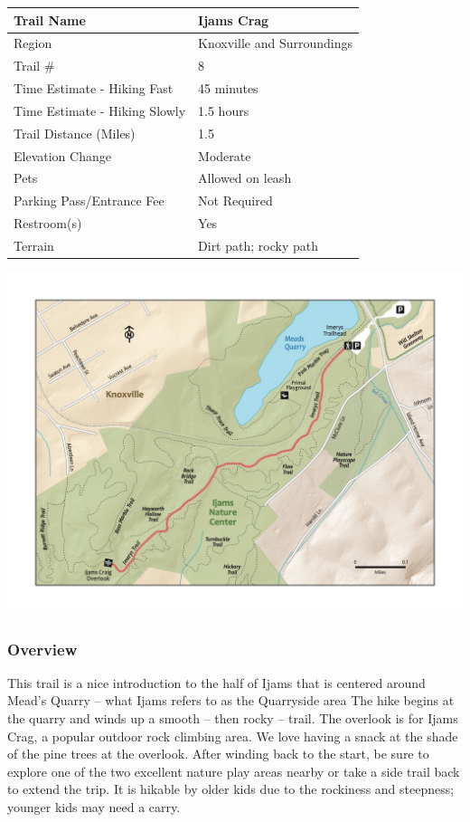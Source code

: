 \documentclass[
  letterpaper,
  DIV=11,
  numbers=noendperiod]{scrartcl}
\begin{document}
\begin{longtable}[]{@{}ll@{}}
\toprule\noalign{}
Trail Name & Ijams Crag \\
\midrule\noalign{}
\endhead
\bottomrule\noalign{}
\endlastfoot
Region & Knoxville and Surroundings \\
Trail \# & 8 \\
Time Estimate - Hiking Fast & 45 minutes \\
Time Estimate - Hiking Slowly & 1.5 hours \\
Trail Distance (Miles) & 1.5 \\
Elevation Change & Moderate \\
Pets & Allowed on leash \\
Parking Pass/Entrance Fee & Not Required \\
Restroom(s) & Yes \\
Terrain & Dirt path; rocky path \\
\end{longtable}

\includegraphics{maps/trail-08-map.jpeg}

\hypertarget{overview-7}{%
\subsubsection{Overview}\label{overview-7}}

This trail is a nice introduction to the half of Ijams that is centered
around Mead's Quarry -- what Ijams refers to as the Quarryside area The
hike begins at the quarry and winds up a smooth -- then rocky -- trail.
The overlook is for Ijams Crag, a popular outdoor rock climbing area. We
love having a snack at the shade of the pine trees at the overlook.
After winding back to the start, be sure to explore one of the two
excellent nature play areas nearby or take a side trail back to extend
the trip. It is hikable by older kids due to the rockiness and
steepness; younger kids may need a carry.
\end{document}
